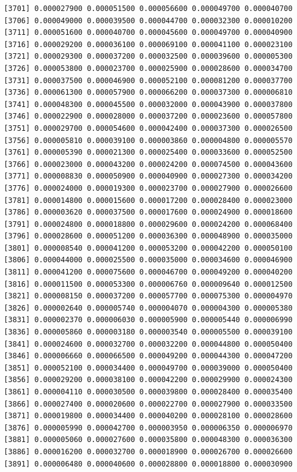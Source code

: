 \documentclass[]{article}
\begin{document}
\begin{verbatim}
 [3701] 0.000027900 0.000051500 0.000056600 0.000049700 0.000040700
 [3706] 0.000049000 0.000039500 0.000044700 0.000032300 0.000010200
 [3711] 0.000051600 0.000040700 0.000045600 0.000049700 0.000040900
 [3716] 0.000029200 0.000036100 0.000069100 0.000041100 0.000023100
 [3721] 0.000029300 0.000037200 0.000032500 0.000039600 0.000005300
 [3726] 0.000053800 0.000023700 0.000025900 0.000028600 0.000034700
 [3731] 0.000037500 0.000046900 0.000052100 0.000081200 0.000037700
 [3736] 0.000061300 0.000057900 0.000066200 0.000037300 0.000006810
 [3741] 0.000048300 0.000045500 0.000032000 0.000043900 0.000037800
 [3746] 0.000022900 0.000028000 0.000037200 0.000023600 0.000057800
 [3751] 0.000029700 0.000054600 0.000042400 0.000037300 0.000026500
 [3756] 0.000005810 0.000039100 0.000003860 0.000004800 0.000005570
 [3761] 0.000005390 0.000021300 0.000025400 0.000033600 0.000052500
 [3766] 0.000023000 0.000043200 0.000024200 0.000074500 0.000043600
 [3771] 0.000008830 0.000050900 0.000040900 0.000027300 0.000034200
 [3776] 0.000024000 0.000019300 0.000023700 0.000027900 0.000026600
 [3781] 0.000014800 0.000015600 0.000017200 0.000028400 0.000023000
 [3786] 0.000003620 0.000037500 0.000017600 0.000024900 0.000018600
 [3791] 0.000024800 0.000018800 0.000029600 0.000024200 0.000068400
 [3796] 0.000028600 0.000051200 0.000036300 0.000048900 0.000035000
 [3801] 0.000008540 0.000041200 0.000053200 0.000042200 0.000050100
 [3806] 0.000044000 0.000025500 0.000035000 0.000034600 0.000046900
 [3811] 0.000041200 0.000075600 0.000046700 0.000049200 0.000040200
 [3816] 0.000011500 0.000053300 0.000006760 0.000009640 0.000012500
 [3821] 0.000008150 0.000037200 0.000057700 0.000075300 0.000004970
 [3826] 0.000002640 0.000005740 0.000004070 0.000004300 0.000005380
 [3831] 0.000002370 0.000006030 0.000005900 0.000005440 0.000006990
 [3836] 0.000005860 0.000003180 0.000003540 0.000005500 0.000039100
 [3841] 0.000024600 0.000032700 0.000032200 0.000044800 0.000050400
 [3846] 0.000006660 0.000066500 0.000049200 0.000044300 0.000047200
 [3851] 0.000052100 0.000034400 0.000049700 0.000039000 0.000050400
 [3856] 0.000029200 0.000038100 0.000042200 0.000029900 0.000024300
 [3861] 0.000004110 0.000030500 0.000039800 0.000028400 0.000035400
 [3866] 0.000027400 0.000020600 0.000022700 0.000027900 0.000033500
 [3871] 0.000019800 0.000034400 0.000040200 0.000028100 0.000028600
 [3876] 0.000005990 0.000042700 0.000003950 0.000006350 0.000006970
 [3881] 0.000005060 0.000027600 0.000035800 0.000048300 0.000036300
 [3886] 0.000016200 0.000032700 0.000018900 0.000026700 0.000026600
 [3891] 0.000006480 0.000040600 0.000028800 0.000018800 0.000030900

\end{verbatim}
\end{document}
